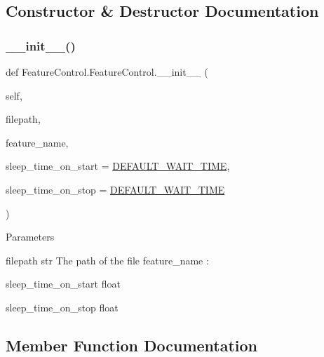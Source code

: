 \subsection{Constructor \& Destructor Documentation}
\mbox{\label{classFeatureControl_1_1FeatureControl_aaddbe7a1596f71ce1a6d462e728c438b}} 
\subsubsection{\texorpdfstring{\+\_\+\+\_\+init\+\_\+\+\_\+()}{\_\_init\_\_()}}
{\footnotesize\ttfamily def Feature\+Control.\+Feature\+Control.\+\_\+\+\_\+init\+\_\+\+\_\+ (\begin{DoxyParamCaption}\item[{}]{self,  }\item[{}]{filepath,  }\item[{}]{feature\+\_\+name,  }\item[{}]{sleep\+\_\+time\+\_\+on\+\_\+start = {\ttfamily \hyperlink{namespaceFeatureControl_aeebd4e13e6a3a0dde7d720af530ae36d}{D\+E\+F\+A\+U\+L\+T\+\_\+\+W\+A\+I\+T\+\_\+\+T\+I\+ME}},  }\item[{}]{sleep\+\_\+time\+\_\+on\+\_\+stop = {\ttfamily \hyperlink{namespaceFeatureControl_aeebd4e13e6a3a0dde7d720af530ae36d}{D\+E\+F\+A\+U\+L\+T\+\_\+\+W\+A\+I\+T\+\_\+\+T\+I\+ME}} }\end{DoxyParamCaption})}

\begin{DoxyParagraph}{Parameters}
\begin{DoxyVerb}filepath    str
            The path of the file
        feature_name        :
\end{DoxyVerb}
 
\end{DoxyParagraph}
\begin{DoxyParagraph}{}
sleep\+\_\+time\+\_\+on\+\_\+start float 
\end{DoxyParagraph}
\begin{DoxyParagraph}{}
sleep\+\_\+time\+\_\+on\+\_\+stop float 
\end{DoxyParagraph}


\subsection{Member Function Documentation}
\mbox{\label{classFeatureControl_1_1FeatureControl_a21f4c45cce80b2be3a1110d44e12fbfc}} 
